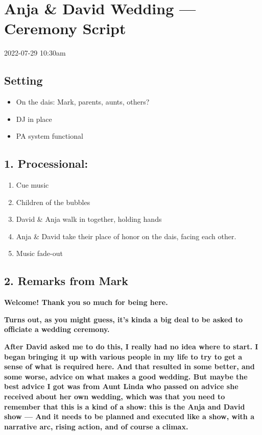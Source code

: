 
\LARGE

\hypertarget{section}{%
\section{Anja \& David Wedding --- Ceremony Script}\label{section}}

2022-07-29 10:30am

\hypertarget{setting}{%
\subsection{Setting}\label{setting}}

\begin{itemize}
\tightlist
\item
  On the dais: Mark, parents, aunts, others?
\item
  DJ in place
\item
  PA system functional
\end{itemize}

\hypertarget{processional}{%
\subsection{1. Processional:}\label{processional}}

\begin{enumerate}
\def\labelenumi{\arabic{enumi}.}
\tightlist
\item
  Cue music
\item
  Children of the bubbles
\item
  David \& Anja walk in together, holding hands
\item
  Anja \& David take their place of honor on the dais, facing each
  other.
\item
  Music fade-out
\end{enumerate}

\hypertarget{remarks-from-mark}{%
\subsection{2. Remarks from Mark}\label{remarks-from-mark}}

\textbf{Welcome! Thank you so much for being here.}

\textbf{Turns out, as you might guess, it's kinda a big deal to be asked
to officiate a wedding ceremony.}

\textbf{After David asked me to do this, I really had no idea where to
start. I began bringing it up with various people in my life to try to
get a sense of what is required here. And that resulted in some better,
and some worse, advice on what makes a good wedding. But maybe the best
advice I got was from Aunt Linda who passed on advice she received about
her own wedding, which was that you need to remember that this is a kind
of a show: this is the Anja and David show --- And it needs to be
planned and executed like a show, with a narrative arc, rising action,
and of course a climax.}

